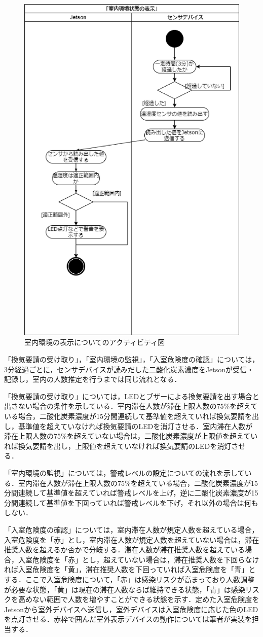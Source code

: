 \begin{figure}
	\centering
	\includegraphics[width=0.6\linewidth]{uml/activity_shitsunai_2}
	\caption{室内環境の表示についてのアクティビティ図}
	\label{activityshitsunai}
\end{figure}

「換気要請の受け取り」，「室内環境の監視」，「入室危険度の確認」については，3分経過ごとに，センサデバイスが読みだした二酸化炭素濃度をJetsonが受信・記録し，室内の人数推定を行うまでは同じ流れとなる．

「換気要請の受け取り」については，LEDとブザーによる換気要請を出す場合と出さない場合の条件を示している．室内滞在人数が滞在上限人数の75\%を超えている場合，二酸化炭素濃度が15分間連続して基準値を超えていれば換気要請を出し，基準値を超えていなければ換気要請のLEDを消灯させる．室内滞在人数が滞在上限人数の75\%を超えていない場合は，二酸化炭素濃度が上限値を超えていれば換気要請を出し，上限値を超えていなければ換気要請のLEDを消灯させる．

「室内環境の監視」については，警戒レベルの設定についての流れを示している．室内滞在人数が滞在上限人数の75\%を超えている場合，二酸化炭素濃度が15分間連続して基準値を超えていれば警戒レベルを上げ，逆に二酸化炭素濃度が15分間連続して基準値を下回っていれば警戒レベルを下げ，それ以外の場合は何もしない．

「入室危険度の確認」については，室内滞在人数が規定人数を超えている場合，入室危険度を「赤」とし，室内滞在人数が規定人数を超えていない場合は，滞在推奨人数を超えるか否かで分岐する．滞在人数が滞在推奨人数を超えている場合，入室危険度を「赤」とし，超えていない場合は，滞在推奨人数を下回らなければ入室危険度を「黄」，滞在推奨人数を下回っていれば入室危険度を「青」とする．ここで入室危険度について，「赤」は感染リスクが高まっており人数調整が必要な状態，「黄」は現在の滞在人数ならば維持できる状態，「青」は感染リスクを高めない範囲で人数を増やすことができる状態を示す．定めた入室危険度をJetsonから室外デバイスへ送信し，室外デバイスは入室危険度に応じた色のLEDを点灯させる．赤枠で囲んだ室外表示デバイスの動作については筆者が実装を担当する．

